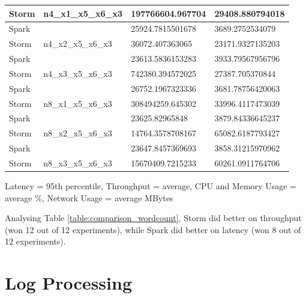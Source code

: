 \documentclass[ppgc,diss,english]{iiufrgs}
\begin{document}
\begin{table}[H]
\begin{tabular}{|l|l|l|l|}
Storm    & \multirow{-2}{*}{n4\_x1\_x5\_x6\_x3} & 197766604.967704                         & \cellcolor[HTML]{34E570}29408.880794018 \\ \hline
Spark    &                                      & \cellcolor[HTML]{34E570}25924.7815501678 & 3689.2752534079 \\ \cline{1-1} \cline{3-4} 
Storm    & \multirow{-2}{*}{n4\_x2\_x5\_x6\_x3} & 36072.407363065                          & \cellcolor[HTML]{34E570}23171.9327135203 \\ \hline
Spark    &                                      & \cellcolor[HTML]{34E570}23613.5836153283 & 3933.79567956796 \\ \cline{1-1} \cline{3-4} 
Storm    & \multirow{-2}{*}{n4\_x3\_x5\_x6\_x3} & 742380.394572025                         & \cellcolor[HTML]{34E570}27387.705370844 \\ \hline
Spark    &                                      & \cellcolor[HTML]{34E570}26752.1967323336 & 3681.78756420063 \\ \cline{1-1} \cline{3-4} 
Storm    & \multirow{-2}{*}{n8\_x1\_x5\_x6\_x3} & 308494259.645302                         & \cellcolor[HTML]{34E570}33996.4117473039 \\ \hline
Spark    &                                      & 23625.82965848                           & 3879.84336645237 \\ \cline{1-1} \cline{3-4} 
Storm    & \multirow{-2}{*}{n8\_x2\_x5\_x6\_x3} & \cellcolor[HTML]{34E570}14764.3578708167 & \cellcolor[HTML]{34E570}65082.6187793427 \\ \hline
Spark    &                                      & \cellcolor[HTML]{34E570}23647.8457369693 & 3858.31215970962 \\ \cline{1-1} \cline{3-4} 
Storm    & \multirow{-2}{*}{n8\_x3\_x5\_x6\_x3} & 15670409.7215233                         & \cellcolor[HTML]{34E570}60261.0911764706 \\ \hline
\end{tabular}
\end{table}

Latency = 95th percentile, Throughput = average, CPU and Memory Usage = average \%, Network Usage = average MBytes

Analysing Table \ref{table:comparison_wordcount}, Storm did better on throughput (won 12 out of 12 experiments), while Spark did better on latency (won 8 out of 12 experiments).




\section{Log Processing}
\end{document}
